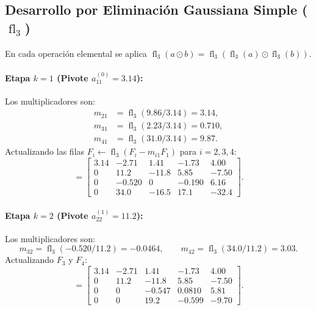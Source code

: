 \documentclass[11pt,letterpaper]{article}
\begin{document}
\subsection{Desarrollo por Eliminación Gaussiana Simple ($\operatorname{fl}_3$)}
En cada operación elemental se aplica $\operatorname{fl}_3(a \odot b) = \operatorname{fl}_3(\operatorname{fl}_3(a) \odot \operatorname{fl}_3(b))$.

\paragraph{Etapa $k = 1$ (Pivote $a_{11}^{(0)} = 3.14$):}
Los multiplicadores son:
\begin{align*}
    m_{21} &= \operatorname{fl}_3(9.86 / 3.14) = 3.14, \\
    m_{31} &= \operatorname{fl}_3(2.23 / 3.14) = 0.710, \\
    m_{41} &= \operatorname{fl}_3(31.0 / 3.14) = 9.87.
\end{align*}
Actualizando las filas $F_i \leftarrow \operatorname{fl}_3(F_i - m_{i1} F_1)$ para $i = 2, 3, 4$:
\begin{equation*}
    [A^{(1)} \mid b^{(1)}] =
    \left[
    \begin{array}{cccc|c}
        3.14 & -2.71  &  1.41 & -1.73 &   4.00 \\
        0    &  11.2  & -11.8 &  5.85 &  -7.50 \\
        0    & -0.520 &  0    & -0.190 &  6.16 \\
        0    &  34.0  & -16.5 &  17.1 & -32.4
    \end{array}
    \right].
\end{equation*}

\paragraph{Etapa $k = 2$ (Pivote $a_{22}^{(1)} = 11.2$):}
Los multiplicadores son:
\begin{equation*}
    m_{32} = \operatorname{fl}_3(-0.520 / 11.2) = -0.0464, \qquad
    m_{42} = \operatorname{fl}_3(34.0 / 11.2) = 3.03.
\end{equation*}
Actualizando $F_3$ y $F_4$:
\begin{equation*}
    [A^{(2)} \mid b^{(2)}] =
    \left[
    \begin{array}{cccc|c}
        3.14 & -2.71 &   1.41 &  -1.73 &  4.00 \\
        0    &  11.2 &  -11.8 &   5.85 & -7.50 \\
        0    &  0    & -0.547 &  0.0810 & 5.81 \\
        0    &  0    &   19.2 & -0.599 & -9.70
    \end{array}
    \right].
\end{equation*}
\end{document}
